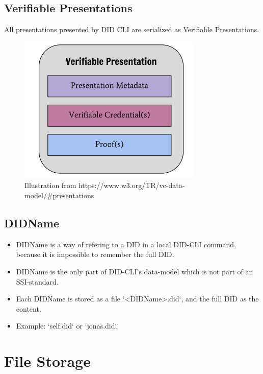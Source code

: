 \newpage

\subsection{Verifiable Presentations}

All presentations presented by DID CLI are serialized as Verifiable Presentations.
    
    \begin{figure}[htbp]
      \centering
      \includegraphics[width=.7\textwidth]{figures/presentation.png}
      \caption[]{Illustration from https://www.w3.org/TR/vc-data-model/\#presentations}
    \end{figure}
    


\subsection{DIDName}
\begin{itemize}
    \item DIDName is a way of refering to a DID in a local DID-CLI command, because it is impossible to remember the full DID.
    \item DIDName is the only part of DID-CLI's data-model which is not part of an SSI-standard.
    \item Each DIDName is stored as a file `<DIDName>.did`, and the full DID as the content.
    \item Example: `self.did` or `jonas.did`.
\end{itemize}




\newpage


\section{File Storage}

